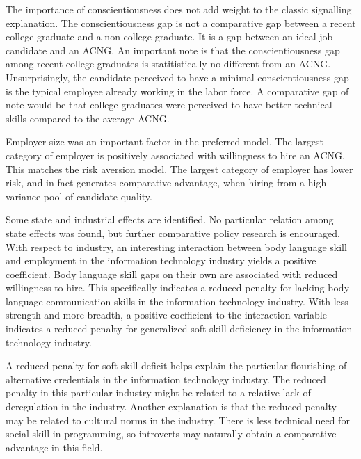 \documentclass[review]{elsarticle}
\begin{document}
The importance of conscientiousness does not add weight to the classic signalling explanation.
The conscientiousness gap is not a comparative gap between a recent college graduate and a non-college graduate.
It is a gap between an ideal job candidate and an ACNG.
An important note is that the conscientiousness gap among recent college graduates is statitistically no different from an ACNG.
Unsurprisingly, the candidate perceived to have a minimal conscientiousness gap is the typical employee already working in the labor force.
A comparative gap of note would be that college graduates were perceived to have better technical skills compared to the average ACNG.

Employer size was an important factor in the preferred model.
The largest category of employer is positively associated with willingness to hire an ACNG.
This matches the risk aversion model.
The largest category of employer has lower risk, and in fact generates comparative advantage, when hiring from a high-variance pool of candidate quality.

Some state and industrial effects are identified.
No particular relation among state effects was found, but further comparative policy research is encouraged.
With respect to industry, an interesting interaction between body language skill and employment in the information technology industry yields a positive coefficient.
Body language skill gaps on their own are associated with reduced willingness to hire.
This specifically indicates a reduced penalty for lacking body language communication skills in the information technology industry.
With less strength and more breadth, a positive coefficient to the interaction variable indicates a reduced penalty for generalized soft skill deficiency in the information technology industry.

A reduced penalty for soft skill deficit helps explain the particular flourishing of alternative credentials in the information technology industry.
The reduced penalty in this particular industry might be related to a relative lack of deregulation in the industry.
Another explanation is that the reduced penalty may be related to cultural norms in the industry.
There is less technical need for social skill in programming, so introverts may naturally obtain a comparative advantage in this field.
\end{document}
